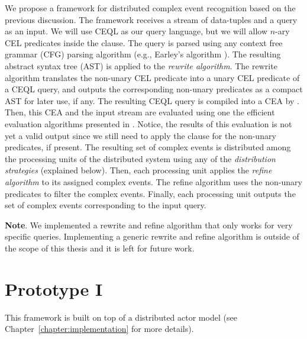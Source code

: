 We propose a framework for distributed complex event recognition based on the previous discussion. The framework receives a stream of data-tuples and a query as an input. We will use CEQL as our query language, but we will allow $n$-ary CEL predicates inside the  clause. The query is parsed using any context free grammar (CFG) parsing algorithm (e.g., Earley's algorithm \cite{earley}). The resulting abstract syntax tree (AST) is applied to the \emph{rewrite algorithm}. The rewrite algorithm translates the non-unary CEL predicate into a unary CEL predicate of a CEQL query, and outputs the corresponding non-unary predicates as a compact AST for later use, if any. The resulting CEQL query is compiled into a CEA by \cite[Theorem~6.2]{formal-framework-cer}. Then, this CEA and the input stream are evaluated using one the efficient evaluation algorithms presented in \cite{formal-framework-cer, core}. Notice, the results of this evaluation is not yet a valid output since we still need to apply the  clause for the non-unary predicates, if present. The resulting set of complex events is distributed among the processing units of the distributed system using any of the \emph{distribution strategies} (explained below). Then, each processing unit applies the \emph{refine algorithm} to its assigned complex events. The refine algorithm uses the non-unary predicates to filter the complex events. Finally, each processing unit outputs the set of complex events corresponding to the input query.

\textbf{Note}. We implemented a rewrite and refine algorithm that only works for very specific queries. Implementing a generic rewrite and refine algorithm is outside of the scope of this thesis and it is left for future work.

\section{Prototype I}\label{sec:prototype:I}

This framework is built on top of a distributed actor model (see Chapter~\ref{chapter:implementation} for more details).


